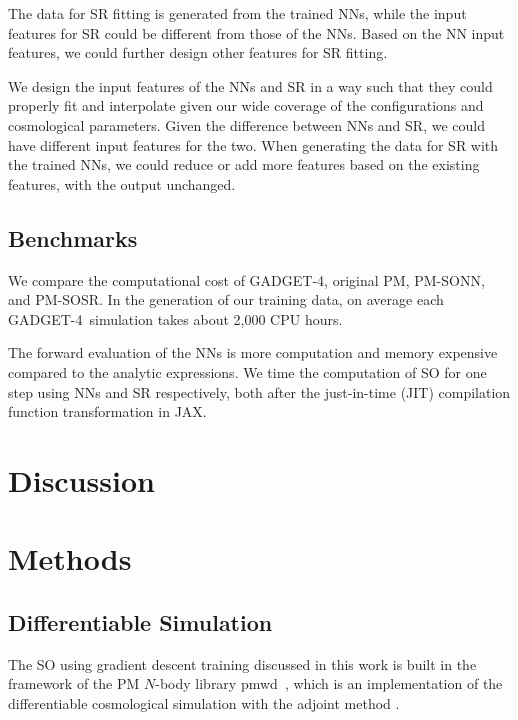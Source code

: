 \documentclass[modern, trackchanges, dvipsnames]{aastex631}
\newcommand{\pmwd}{{\usefont{T1}{nova}{m}{sl}pmwd}}
\newcommand{\GADGET}{{{\fontsize{10pt}{12pt}\selectfont GADGET}-4}}
\begin{document}
The data for SR fitting is generated from the trained NNs, while the
input features for SR could be different from those of the NNs.
Based on the NN input features, we could further design other features
for SR fitting.

We design the input features of the NNs and SR in a way such that they
could properly fit and interpolate given our wide coverage of the
configurations and cosmological parameters.
Given the difference between NNs and SR, we could have different input
features for the two.
When generating the data for SR with the trained NNs, we could reduce or
add more features based on the existing features, with the output
unchanged.


\subsection{Benchmarks}
We compare the computational cost of \GADGET, original PM, PM-SONN, and
PM-SOSR.
In the generation of our training data, on average each \GADGET\
simulation takes about 2,000 CPU hours.


The forward evaluation of the NNs is more computation and memory
expensive compared to the analytic expressions.
We time the computation of SO for one step using NNs and SR
respectively, both after the just-in-time (JIT) compilation function
transformation in JAX.


\vspace{1em}
\section{Discussion}


\vspace{1em}
\section{Methods}


\vspace{1em}
\subsection{Differentiable Simulation}
\label{sec:pmwd}

The SO using gradient descent training discussed in this work is built
in the framework of the PM $N$-body library \pmwd\ \citep{Li2022b},
which is an implementation of the differentiable cosmological simulation
with the adjoint method \citep{Li2022a}.
\end{document}
